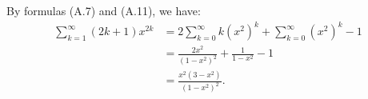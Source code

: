 By formulas (A.7) and (A.11), we have:
\begin{align*}
    \sum_{k=1}^\infty(2k+1)x^{2k} &= 2\sum_{k=0}^\infty k(x^2)^k + \sum_{k=0}^\infty(x^2)^k-1 \\
    &= \frac{2x^2}{(1-x^2)^2} + \frac{1}{1-x^2}-1 \\
    &= \frac{x^2(3-x^2)}{(1-x^2)^2}.
\end{align*}
